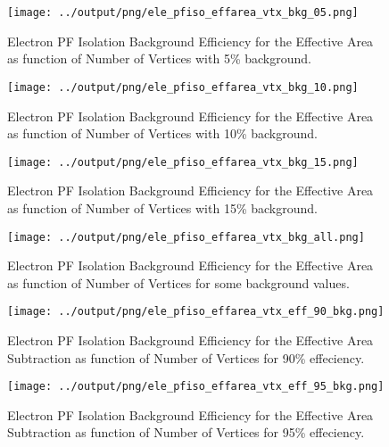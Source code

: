 \documentclass[11pt]{book}
\begin{document}
\begin{figure}[htb]
\centering
\texttt{[image: ../output/png/ele\_pfiso\_effarea\_vtx\_bkg\_05.png]}
\caption{Electron PF Isolation Background Efficiency for the Effective Area as function of Number of Vertices with 5\% background.}
\label{fig:ele_pfiso_vtx_bkg_effarea_bkg_05}
\end{figure}

\begin{figure}[htb]
\centering
\texttt{[image: ../output/png/ele\_pfiso\_effarea\_vtx\_bkg\_10.png]}
\caption{Electron PF Isolation Background Efficiency for the Effective Area as function of Number of Vertices with 10\% background.}
\label{fig:ele_pfiso_vtx_bkg_effarea_bkg_10}
\end{figure}

\begin{figure}[htb]
\centering
\texttt{[image: ../output/png/ele\_pfiso\_effarea\_vtx\_bkg\_15.png]}
\caption{Electron PF Isolation Background Efficiency for the Effective Area as function of Number of Vertices with 15\% background.}
\label{fig:ele_pfiso_vtx_bkg_effarea_bkg_15}
\end{figure}

\begin{figure}[htb]
\centering
\texttt{[image: ../output/png/ele\_pfiso\_effarea\_vtx\_bkg\_all.png]}
\caption{Electron PF Isolation Background Efficiency for the Effective Area as function of Number of Vertices for some background values.}
\label{fig:ele_pfiso_vtx_bkg_effarea_bkg_all}
\end{figure}

\begin{figure}[htb]
\centering
\texttt{[image: ../output/png/ele\_pfiso\_effarea\_vtx\_eff\_90\_bkg.png]}
\caption{Electron PF Isolation Background Efficiency for the Effective Area Subtraction as function of Number of Vertices for 90\% effeciency.}
\label{fig:ele_pfiso_vtx_eff_effarea_eff_90_bkg}
\end{figure}

\begin{figure}[htb]
\centering
\texttt{[image: ../output/png/ele\_pfiso\_effarea\_vtx\_eff\_95\_bkg.png]}
\caption{Electron PF Isolation Background Efficiency for the Effective Area Subtraction as function of Number of Vertices for 95\% effeciency.}
\label{fig:ele_pfiso_vtx_eff_effarea_eff_95_bkg}
\end{figure}
\end{document}
